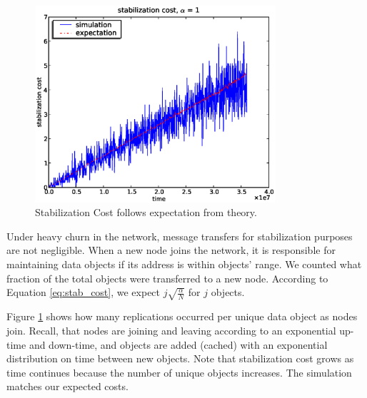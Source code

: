 \documentclass[9.5pt,journal,final,finalsubmission,twocolumn]{IEEEtran}
\begin{document}
\begin{figure}
\centering
\includegraphics[width=3.5in]{stab_cost}
\caption{Stabilization Cost follows expectation from theory.} \label{fig:stab_cost}
\end{figure}
Under heavy churn in the network, message transfers for stabilization purposes
are not negligible. When a new node joins the network, it
is responsible for maintaining data objects if its address is within 
objects' range.
We counted what fraction of the total objects were transferred to a new node.
According to Equation \ref{eq:stab_cost}, we expect $j\sqrt{\frac{\alpha}{N}}$
for $j$ objects.

Figure \ref{fig:stab_cost} shows how many replications occurred per unique
data object as nodes join.  Recall, that nodes are joining and leaving
according to an exponential up-time and down-time, and objects are
added (cached) with an exponential distribution on time between new objects.
Note that stabilization cost grows as time continues because
the number of unique objects increases.  The simulation matches our
expected costs.

\iffalse
\end{document}
